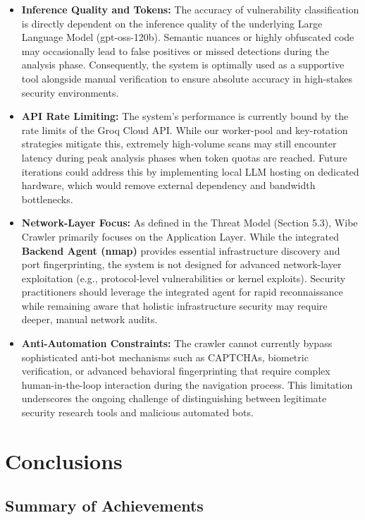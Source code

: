 \documentclass[12pt,oneside,a4paper]{book}
\begin{document}
\begin{itemize}
  \item \textbf{Inference Quality and Tokens:} The accuracy of vulnerability classification is directly dependent on the inference quality of the underlying Large Language Model (gpt-oss-120b). Semantic nuances or highly obfuscated code may occasionally lead to false positives or missed detections during the analysis phase. Consequently, the system is optimally used as a supportive tool alongside manual verification to ensure absolute accuracy in high-stakes security environments.
  \item \textbf{API Rate Limiting:} The system's performance is currently bound by the rate limits of the Groq Cloud API. While our worker-pool and key-rotation strategies mitigate this, extremely high-volume scans may still encounter latency during peak analysis phases when token quotas are reached. Future iterations could address this by implementing local LLM hosting on dedicated hardware, which would remove external dependency and bandwidth bottlenecks.
  \item \textbf{Network-Layer Focus:} As defined in the Threat Model (Section 5.3), Wibe Crawler primarily focuses on the Application Layer. While the integrated \textbf{Backend Agent (nmap)} provides essential infrastructure discovery and port fingerprinting, the system is not designed for advanced network-layer exploitation (e.g., protocol-level vulnerabilities or kernel exploits). Security practitioners should leverage the integrated agent for rapid reconnaissance while remaining aware that holistic infrastructure security may require deeper, manual network audits.
  \item \textbf{Anti-Automation Constraints:} The crawler cannot currently bypass sophisticated anti-bot mechanisms such as CAPTCHAs, biometric verification, or advanced behavioral fingerprinting that require complex human-in-the-loop interaction during the navigation process. This limitation underscores the ongoing challenge of distinguishing between legitimate security research tools and malicious automated bots.
\end{itemize}




\chapter{Conclusions}
\label{chap:conclusions}

\section{Summary of Achievements}
\end{document}
